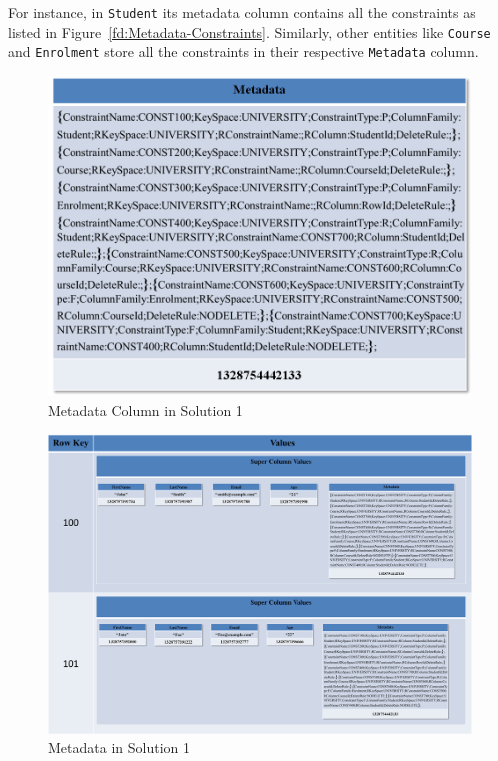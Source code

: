 For instance, in \texttt{Student}  
its metadata column  contains all the constraints as listed in
Figure~\ref{fd:Metadata-Constraints}. 
Similarly,  other entities like
\texttt{Course} and \texttt{Enrolment} store all the constraints in their
respective \texttt{Metadata} column.

	\begin{figure}[h] 
			\centering
				\includegraphics[width=.8\textwidth]{./figure/Solutions/Sol1-MD-Col.png}
				\caption{Metadata Column in Solution 1}
				\label{fd:Metadata-Column}
	\end{figure}
	    
	\begin{figure}
		\begin{landscape}
			\centering
			\includegraphics[width=1\textwidth]{./figure/Solutions/Sol1-MD-ColumnFamily.png}
			
			\caption{Metadata in Solution 1}\label{fd:Metadata-Solution1}
			\end{landscape}
		\end{figure}
	
